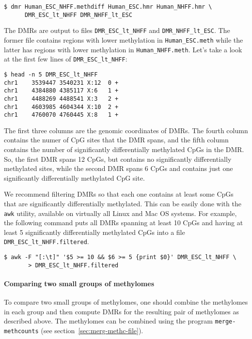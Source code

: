 \documentclass[10pt]{article}
\begin{document}
{\small{%
\begin{verbatim}
$ dmr Human_ESC_NHFF.methdiff Human_ESC.hmr Human_NHFF.hmr \
      DMR_ESC_lt_NHFF DMR_NHFF_lt_ESC
\end{verbatim}%
}}
The DMRs are output to files {\tt DMR\_ESC\_lt\_NHFF} and 
{\tt DMR\_NHFF\_lt\_ESC}. The former file contains regions with 
lower methylation in {\tt Human\_ESC.meth} while the latter  has 
regions with lower methylation in {\tt Human\_NHFF.meth}. Let's take 
a look at the first few lines of {\tt DMR\_ESC\_lt\_NHFF}:

{\small{%
\begin{verbatim}
$ head -n 5 DMR_ESC_lt_NHFF
chr1	3539447	3540231	X:12  0	+
chr1	4384880	4385117	X:6	  1	+
chr1	4488269	4488541	X:3	  2	+
chr1	4603985	4604344	X:10  2	+
chr1	4760070	4760445	X:8   1	+
\end{verbatim}%
}}

The first three columns are the genomic coordinates of DMRs. The fourth
column contains the numer of CpG sites that the DMR spans, and the fifth 
column contains the number of significantly differentially methylated 
CpGs in the DMR. So, the first DMR spans 12 CpGs, but contains no 
significantly differentially methylated sites, while the second DMR spans 
6 CpGs and contains just one significantly differentially methylated CpG 
site.

We recommend filtering DMRs so that each one contains at least some 
CpGs that are significantly differentially methylated. This can be easily 
done with the {\tt awk} utility, available on virtually all Linux and Mac OS 
systems. For example, the following command puts all DMRs spanning 
at least 10 CpGs and having at least 5 significantly differentially 
methylated CpGs into a file {\tt DMR\_ESC\_lt\_NHFF.filtered}.
{\small{%
\begin{verbatim}
$ awk -F "[:\t]" '$5 >= 10 && $6 >= 5 {print $0}' DMR_ESC_lt_NHFF \
       > DMR_ESC_lt_NHFF.filtered
\end{verbatim}%
}}

\paragraph{Comparing two small groups of methylomes} To compare two small 
groups of methylomes, one should combine the methylomes in each group and 
then compute DMRs for the resulting pair of methylomes as described above. 
The methylomes can be combined using the program {\tt merge-methcounts} 
(see section~\ref{sec:merg-methc-file}).
\end{document}
